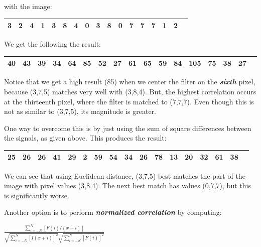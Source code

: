 \documentclass{report}
\begin{document}
with the image:

\begin{table}[h]
\centering
\label{my-label-6}
\begin{tabular}{|l|l|l|l|l|l|l|l|l|l|l|l|l|l|l|l|l|}
\hline
3 & 2 & 4 & 1 & 3 & 8 & 4 & 0 & 3 & 8 & 0 & 7 & 7 & 7 & 1 & 2\\ \hline
\end{tabular}
\end{table}

We get the following the result:

\begin{table}[h]
\centering
\label{my-label-7}
\begin{tabular}{|l|l|l|l|l|l|l|l|l|l|l|l|l|l|l|l|l|}
\hline
40 & 43 & 39 & 34 & 64 & 85 & 52 & 27 & 61 & 65 & 59 & 84 & 105 & 75 & 38 & 27 \\ \hline
\end{tabular}
\end{table}

Notice that we get a high result (85) when we center the filter on the \textbf{\textit{sixth}} pixel, because (3,7,5) matches very well with (3,8,4). But, the highest correlation occurs at the thirteenth pixel, where the filter is matched to (7,7,7). Even though this is not as similar to (3,7,5), its magnitude is greater.\newline\newline

One way to overcome this is by just using the sum of square differences between the signals, as given above. This produces the result:\newline

\begin{table}[h]
\centering
\label{my-label-8}
\begin{tabular}{|l|l|l|l|l|l|l|l|l|l|l|l|l|l|l|l|l|}
\hline
25 & 26 & 26 & 41 & 29 & 2 & 59 & 54 & 34 & 26 & 78 & 13 & 20 & 32 & 61 & 38 \\ \hline
\end{tabular}
\end{table}

We can see that using Euclidean distance, (3,7,5) best matches the part of the image with pixel values (3,8,4). The next best match has values (0,7,7), but this is significantly worse.\newline\newline

Another option is to perform \textbf{\textit{normalized correlation}} by computing:\newline\newline
    \centerline{$\frac{\sum_{i=-N}^N [F(i)I(x+i)]}{\sqrt{\sum_{i=-N}^N [I(x+i)]^2} \sqrt{\sum_{i=-N}^N [F(i)]^2}}$}
\end{document}
